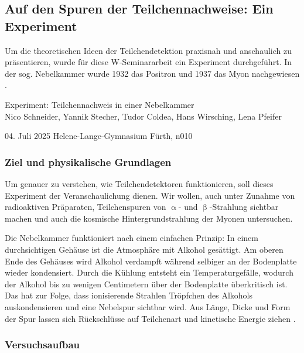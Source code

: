 \documentclass[a4paper,12pt]{article}
\begin{document}
\subsection{Auf den Spuren der Teilchennachweise: Ein Experiment} \label{ssec:25}

Um die theoretischen Ideen der Teilchendetektion praxisnah und anschaulich zu präsentieren, wurde für diese W-Seminararbeit ein Experiment durchgeführt. In der sog. Nebelkammer wurde 1932 das Positron \cite{Anderson1933} und 1937 das Myon nachgewiesen \cite{Street1937}.
\begin{center}
\large Experiment: Teilchennachweis in einer Nebelkammer \\
\small Nico Schneider, Yannik Stecher, Tudor Coldea, Hans Wirsching, Lena Pfeifer
\end{center} 
\normalsize 04. Juli 2025
\hfill
Helene-Lange-Gymnasium Fürth, n010



\subsubsection{Ziel und physikalische Grundlagen} \label{sssec:251}

Um genauer zu verstehen, wie Teilchendetektoren funktionieren, soll dieses Experiment der Veranschaulichung dienen. Wir wollen, auch unter Zunahme von radioaktiven Präparaten, Teilchenspuren von $\upalpha$- und $\upbeta$-Strahlung sichtbar machen und auch die kosmische Hintergrundstrahlung der Myonen untersuchen. \par
Die Nebelkammer funktioniert nach einem einfachen Prinzip: In einem durchsichtigen Gehäuse ist die Atmosphäre mit Alkohol gesättigt. Am oberen Ende des Gehäuses wird Alkohol verdampft während selbiger an der Bodenplatte wieder kondensiert. Durch die Kühlung entsteht ein Temperaturgefälle, wodurch der Alkohol bis zu wenigen Centimetern über der Bodenplatte überkritisch ist. Das hat zur Folge, dass ionisierende Strahlen Tröpfchen des Alkohols auskondensieren und eine Nebelspur sichtbar wird. Aus Länge, Dicke und Form der Spur lassen sich Rückschlüsse auf Teilchenart und kinetische Energie ziehen \cite[166--167]{Kolanoski2016}.

\subsubsection{Versuchsaufbau} \label{sssec:252}
\end{document}
